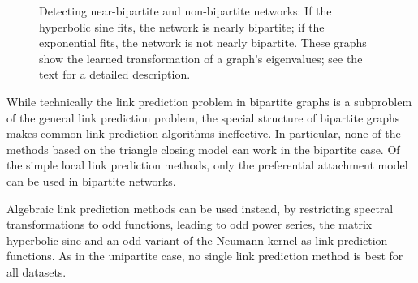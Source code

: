 \documentclass[11pt,a4paper]{book}
\begin{document}
\begin{figure}[h!]
  \centering
  \caption{                     
    Detecting near-bipartite and non-bipartite networks: If the
    hyperbolic sine fits, the network is nearly bipartite; if the
    exponential fits, the network is not nearly bipartite.  
    These graphs show the learned transformation of a graph's
    eigenvalues; see the text for a detailed description.
  }
  \label{fig:near-bipartite}
\end{figure}

\label{sec:bipartite:discussion} 
While technically the link prediction problem in bipartite graphs is a
subproblem of the general link prediction problem, the special structure
of bipartite graphs makes common link prediction algorithms
ineffective.  In particular, none of the methods based on the triangle closing
model can work in the bipartite case.  Of the simple local link
prediction methods, only the preferential attachment model can be used
in bipartite networks. 

Algebraic link prediction methods can be used instead, 
by restricting spectral transformations to odd functions,
leading to odd power series, the matrix hyperbolic sine and an
odd variant of the Neumann kernel as link prediction functions. 
As in the unipartite case, no single link prediction method is best for
all datasets. 
\end{document}
